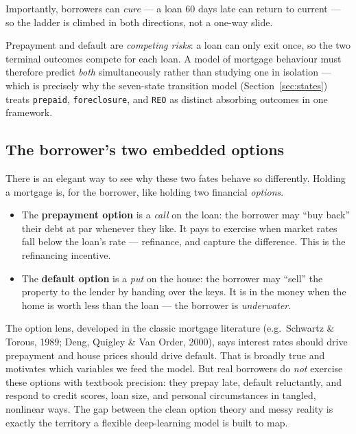 \documentclass[11pt]{article}
\begin{document}
Importantly, borrowers can \emph{cure} --- a loan 60 days late can return to current --- so the
ladder is climbed in both directions, not a one-way slide.

\begin{keyidea}
Prepayment and default are \emph{competing risks}: a loan can only exit once, so the two
terminal outcomes compete for each loan. A model of mortgage behaviour must therefore predict
\emph{both} simultaneously rather than studying one in isolation --- which is precisely why the
seven-state transition model (Section~\ref{sec:states}) treats \texttt{prepaid},
\texttt{foreclosure}, and \texttt{REO} as distinct absorbing outcomes in one framework.
\end{keyidea}

\subsection{The borrower's two embedded options}

There is an elegant way to see why these two fates behave so differently. Holding a mortgage
is, for the borrower, like holding two financial \emph{options}.

\begin{itemize}[leftmargin=1.4em, itemsep=2pt]
  \item The \textbf{prepayment option} is a \emph{call} on the loan: the borrower may ``buy
        back'' their debt at par whenever they like. It pays to exercise when market rates fall
        below the loan's rate --- refinance, and capture the difference. This is the
        refinancing incentive.
  \item The \textbf{default option} is a \emph{put} on the house: the borrower may ``sell'' the
        property to the lender by handing over the keys. It is in the money when the home is
        worth less than the loan --- the borrower is \emph{underwater}.
\end{itemize}

\begin{intuition}
The option lens, developed in the classic mortgage literature (e.g.\ Schwartz \& Torous, 1989;
Deng, Quigley \& Van Order, 2000), says interest rates should drive prepayment and house
prices should drive default. That is broadly true and motivates which variables we feed the
model. But real borrowers do \emph{not} exercise these options with textbook precision: they
prepay late, default reluctantly, and respond to credit scores, loan size, and personal
circumstances in tangled, nonlinear ways. The gap between the clean option theory and messy
reality is exactly the territory a flexible deep-learning model is built to map.
\end{intuition}
\end{document}
